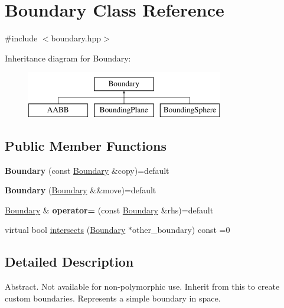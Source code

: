\hypertarget{class_boundary}{}\section{Boundary Class Reference}
\label{class_boundary}


{\ttfamily \#include $<$boundary.\+hpp$>$}

Inheritance diagram for Boundary\+:\begin{figure}[H]
\begin{center}
\leavevmode
\includegraphics[height=2.000000cm]{class_boundary}
\end{center}
\end{figure}
\subsection*{Public Member Functions}
\begin{DoxyCompactItemize}
\item 
\mbox{\label{class_boundary_a1c95b0fe70da9152d4a6c125cb424973}} 
{\bfseries Boundary} (const \mbox{\hyperlink{class_boundary}{Boundary}} \&copy)=default
\item 
\mbox{\label{class_boundary_adca3ef87d10d6f79ec68ee2489498907}} 
{\bfseries Boundary} (\mbox{\hyperlink{class_boundary}{Boundary}} \&\&move)=default
\item 
\mbox{\label{class_boundary_a2028692d79f9c89bfe6232147d282991}} 
\mbox{\hyperlink{class_boundary}{Boundary}} \& {\bfseries operator=} (const \mbox{\hyperlink{class_boundary}{Boundary}} \&rhs)=default
\item 
virtual bool \mbox{\hyperlink{class_boundary_a364909bdfa4a4945f974c34a39e198cc}{intersects}} (\mbox{\hyperlink{class_boundary}{Boundary}} $\ast$other\+\_\+boundary) const =0
\end{DoxyCompactItemize}


\subsection{Detailed Description}
Abstract. Not available for non-\/polymorphic use. Inherit from this to create custom boundaries. Represents a simple boundary in space. 

